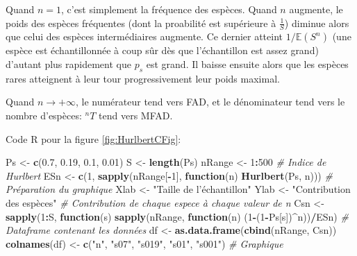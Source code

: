 \documentclass[
  11pt,
  french,
  a4paper,
  extrafontsizes,onecolumn,openright
  ]{memoir}
\newenvironment{Shaded}{\begin{snugshade}}{\end{snugshade}}
\newcommand{\CommentTok}[1]{\textcolor[rgb]{0.56,0.35,0.01}{\textit{#1}}}
\newcommand{\ControlFlowTok}[1]{\textcolor[rgb]{0.13,0.29,0.53}{\textbf{#1}}}
\newcommand{\DecValTok}[1]{\textcolor[rgb]{0.00,0.00,0.81}{#1}}
\newcommand{\FloatTok}[1]{\textcolor[rgb]{0.00,0.00,0.81}{#1}}
\newcommand{\KeywordTok}[1]{\textcolor[rgb]{0.13,0.29,0.53}{\textbf{#1}}}
\newcommand{\NormalTok}[1]{#1}
\newcommand{\OperatorTok}[1]{\textcolor[rgb]{0.81,0.36,0.00}{\textbf{#1}}}
\newcommand{\StringTok}[1]{\textcolor[rgb]{0.31,0.60,0.02}{#1}}
\begin{document}
Quand \(n=1\), c'est simplement la fréquence des espèces.
Quand \(n\) augmente, le poids des espèces fréquentes (dont la proabilité est supérieure à \(\frac{1}{S}\)) diminue alors que celui des espèces intermédiaires augmente.
Ce dernier atteint \({1}/{{\mathbb E}(S^n)}\) (une espèce est échantillonnée à coup sûr dès que l'échantillon est assez grand) d'autant plus rapidement que \(p_s\) est grand.
Il baisse ensuite alors que les espèces rares atteignent à leur tour progressivement leur poids maximal.

Quand \(n \to +\infty\), le numérateur tend vers FAD, et le dénominateur tend vers le nombre d'espèces: \(^n{T}\) tend vers MFAD.

Code R pour la figure \ref{fig:HurlbertCFig}:

\scriptsize

\begin{Shaded}
\begin{Highlighting}[]
\NormalTok{Ps <-}\StringTok{ }\KeywordTok{c}\NormalTok{(}\FloatTok{0.7}\NormalTok{, }\FloatTok{0.19}\NormalTok{, }\FloatTok{0.1}\NormalTok{, }\FloatTok{0.01}\NormalTok{)}
\NormalTok{S <-}\StringTok{ }\KeywordTok{length}\NormalTok{(Ps)}
\NormalTok{nRange <-}\StringTok{ }\DecValTok{1}\OperatorTok{:}\DecValTok{500}
\CommentTok{# Indice de Hurlbert}
\NormalTok{ESn <-}\StringTok{ }\KeywordTok{c}\NormalTok{(}\DecValTok{1}\NormalTok{, }\KeywordTok{sapply}\NormalTok{(nRange[}\OperatorTok{-}\DecValTok{1}\NormalTok{], }\ControlFlowTok{function}\NormalTok{(n) }\KeywordTok{Hurlbert}\NormalTok{(Ps, n)))}
\CommentTok{# Préparation du graphique}
\NormalTok{Xlab <-}\StringTok{ "Taille de l'échantillon"}
\NormalTok{Ylab <-}\StringTok{ "Contribution des espèces"}
\CommentTok{# Contribution de chaque espece à chaque valeur de n}
\NormalTok{Csn <-}\StringTok{ }\KeywordTok{sapply}\NormalTok{(}\DecValTok{1}\OperatorTok{:}\NormalTok{S, }\ControlFlowTok{function}\NormalTok{(s) }\KeywordTok{sapply}\NormalTok{(nRange, }
              \ControlFlowTok{function}\NormalTok{(n) (}\DecValTok{1}\OperatorTok{-}\NormalTok{(}\DecValTok{1}\OperatorTok{-}\NormalTok{Ps[s])}\OperatorTok{^}\NormalTok{n))}\OperatorTok{/}\NormalTok{ESn)}
\CommentTok{# Dataframe contenant les données}
\NormalTok{df <-}\StringTok{ }\KeywordTok{as.data.frame}\NormalTok{(}\KeywordTok{cbind}\NormalTok{(nRange, Csn))}
\KeywordTok{colnames}\NormalTok{(df) <-}\StringTok{ }\KeywordTok{c}\NormalTok{(}\StringTok{"n"}\NormalTok{, }\StringTok{"s07"}\NormalTok{, }\StringTok{"s019"}\NormalTok{, }\StringTok{"s01"}\NormalTok{, }\StringTok{"s001"}\NormalTok{)}
\CommentTok{# Graphique}

\end{Highlighting}
\end{Shaded}
\end{document}
